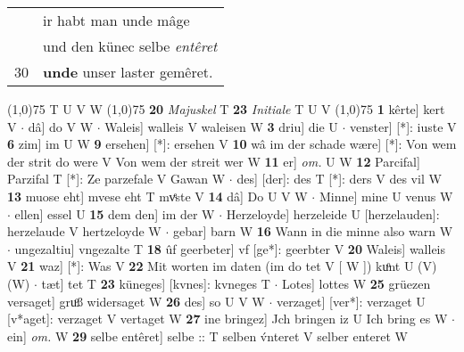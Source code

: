 \documentclass[8pt,a4paper,notitlepage]{article}
\begin{document}
\begin{table}[ht]
\begin{minipage}[t]{0.5\linewidth}
\begin{tabular}{rl}
 & ir habt man unde mâge\\ 
 & und den künec selbe \textit{entêret}\\ 
30 & \textbf{unde} unser laster gemêret.\\ 
\end{tabular}
\scriptsize
\line(1,0){75} \newline
T U V W \newline
\line(1,0){75} \newline
\textbf{20} \textit{Majuskel} T  \textbf{23} \textit{Initiale} T U V  \newline
\line(1,0){75} \newline
\textbf{1} kêrte] kert V  $\cdot$ dâ] do V W  $\cdot$ Waleis] walleis V waleisen W \textbf{3} driu] die U  $\cdot$ venster] [*]: iuste V \textbf{6} zim] im U W \textbf{9} ersehen] [*]: ersehen V \textbf{10} wâ im der schade wære] [*]: Von wem der strit do were V Von wem der streit wer W \textbf{11} er] \textit{om.} U W \textbf{12} Parcifal] Parzifal T [*]: Ze parzefale V Gawan W  $\cdot$ des] [der]: des T [*]: ders V des vil W \textbf{13} muose eht] mvese eht T mvͤste V \textbf{14} dâ] Do U V W  $\cdot$ Minne] mine U venus W  $\cdot$ ellen] essel U \textbf{15} dem den] im der W  $\cdot$ Herzeloyde] herzeleide U [herzelauden]: herzelaude V hertzeloyde W  $\cdot$ gebar] barn W \textbf{16} Wann in die minne also warn W  $\cdot$ ungezaltiu] vngezalte T \textbf{18} ûf geerbeter] vf [ge*]: geerbter V \textbf{20} Waleis] walleis V \textbf{21} waz] [*]: Was V \textbf{22} Mit worten im daten (im do tet V [ W ]) kuͦnt U (V) (W)  $\cdot$ tæt] tet T \textbf{23} küneges] [kvnes]: kvneges T  $\cdot$ Lotes] lottes W \textbf{25} grüezen versaget] gruͦß widersaget W \textbf{26} des] so U V W  $\cdot$ verzaget] [ver*]: verzaget U [v*aget]: verzaget V vertaget W \textbf{27} ine bringez] Jch bringen iz U Ich bring es W  $\cdot$ ein] \textit{om.} W \textbf{29} selbe entêret] selbe :: T selben v́nteret V selber enteret W \newline
\end{minipage}
\end{table}
\end{document}
